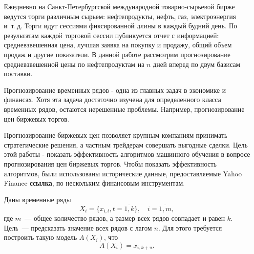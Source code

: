 \documentclass[a4paper,article,14pt]{extarticle}
\begin{document}


\tableofcontents
\pagebreak
{}


Ежедневно на Санкт-Петербургской международной товарно-сырьевой бирже\cite{spimex} ведутся торги различным сырьем: нефтепродукты, нефть, газ, электроэнергия и~т.\,д.
Торги идут сессиями фиксированной длины в каждый будний день. По результатам каждой торговой сессии публикуется отчет с информацией: средневзвешенная цена, лучшая заявка на покупку и продажу, общий объем продаж и другие показатели.
В данной работе рассмотрим прогнозирование средневзвешенной цены по нефтепродуктам на $n$ дней вперед по двум базисам поставки.


Прогнозирование временных рядов - одна из главных задач в экономике и финансах.
Хотя эта задача достаточно изучена для определенного класса временных рядов, остаются нерешенные проблемы.
Например, прогнозирование цен биржевых торгов.
\par
Прогнозирование биржевых цен позволяет крупным компаниям принимать стратегические решения, а частным трейдерам совершать выгодные сделки.
Цель этой работы - показать эффективность алгоритмов машинного обучения в вопросе прогнозирования цен биржевых торгов.
Чтобы показать эффективность алгоритмов, были использованы исторические данные, предоставляемые Yahoo Finance \textbf{ссылка}, по нескольким финансовым инструментам.


Даны временные ряды
\begin{equation}
    {X_{i} = \{x_{i,t}, t=\overline{1,k}\},\quad i=\overline{1,m}},\label{eq:equation}
\end{equation}
где $m$~--- общее количество рядов, а размер всех рядов совпадает и равен $k$.
Цель~--- предсказать значение всех рядов с лагом $n$.
Для этого требуется построить такую модель $A(X_i)$, что
\begin{equation}
    A(X_i)=x_{i, k+n}.\label{eq:equation2}
\end{equation}

\end{document}

